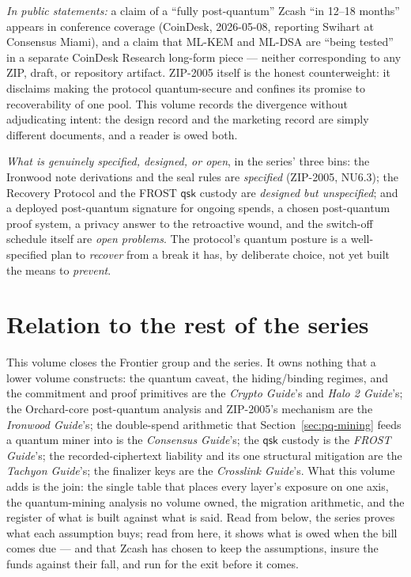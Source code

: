 \documentclass[11pt,a4paper]{article}
\theoremstyle{definition}
\begin{document}
\emph{In public statements:} a claim of a ``fully post-quantum'' Zcash
``in 12--18 months'' appears in conference coverage (CoinDesk,
2026-05-08, reporting Swihart at Consensus Miami), and a claim that
ML-KEM and ML-DSA are ``being tested'' in a separate CoinDesk Research
long-form piece --- neither corresponding to any ZIP, draft, or
repository artifact. ZIP-2005 itself is the honest counterweight:
it disclaims making the protocol quantum-secure and confines its promise
to recoverability of one pool. This volume records the divergence
without adjudicating intent: the design record and the marketing record
are simply different documents, and a reader is owed both.

\emph{What is genuinely specified, designed, or open}, in the series'
three bins: the Ironwood note derivations and the seal rules are
\emph{specified} (ZIP-2005, NU6.3); the Recovery Protocol and the FROST
$\mathsf{qsk}$ custody are \emph{designed but unspecified}; and a
deployed post-quantum signature for ongoing spends, a chosen
post-quantum proof system, a privacy answer to the retroactive wound,
and the switch-off schedule itself are \emph{open problems}. The
protocol's quantum posture is a well-specified plan to \emph{recover}
from a break it has, by deliberate choice, not yet built the means to
\emph{prevent}.

\section{Relation to the rest of the series}\label{sec:pq-relations}

This volume closes the Frontier group and the series. It owns nothing
that a lower volume constructs: the quantum caveat, the hiding/binding
regimes, and the commitment and proof primitives are the \emph{Crypto
Guide}'s and \emph{Halo 2 Guide}'s; the Orchard-core post-quantum
analysis and ZIP-2005's mechanism are the \emph{Ironwood Guide}'s; the
double-spend arithmetic that Section~\ref{sec:pq-mining} feeds a quantum
miner into is the \emph{Consensus Guide}'s; the $\mathsf{qsk}$ custody
is the \emph{FROST Guide}'s; the recorded-ciphertext liability and its
one structural mitigation are the \emph{Tachyon Guide}'s; the finalizer
keys are the \emph{Crosslink Guide}'s. What this volume adds is the
join: the single table that places every layer's exposure on one axis,
the quantum-mining analysis no volume owned, the migration arithmetic,
and the register of what is built against what is said. Read from below,
the series proves what each assumption buys; read from here, it shows
what is owed when the bill comes due --- and that Zcash has chosen to
keep the assumptions, insure the funds against their fall, and run for
the exit before it comes.
\end{document}

